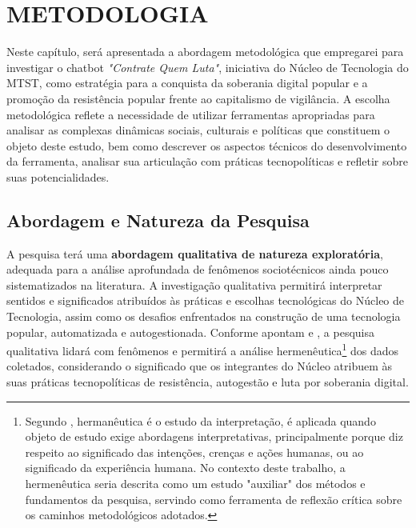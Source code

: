 
\chapter{METODOLOGIA}
\label{chap:metodologia}

Neste capítulo, será apresentada a abordagem metodológica que empregarei para investigar o chatbot \textit{"Contrate Quem Luta"}, iniciativa do Núcleo de Tecnologia do MTST, como estratégia para a conquista da soberania digital popular e a promoção da resistência popular frente ao capitalismo de vigilância. A escolha metodológica reflete a necessidade de utilizar ferramentas apropriadas para analisar as complexas dinâmicas sociais, culturais e políticas que constituem o objeto deste estudo, bem como descrever os aspectos técnicos do desenvolvimento da ferramenta, analisar sua articulação com práticas tecnopolíticas e refletir sobre suas potencialidades.


\section{Abordagem e Natureza da Pesquisa}
A pesquisa terá uma \textbf{abordagem qualitativa de natureza exploratória}, adequada para a análise aprofundada de fenômenos sociotécnicos ainda pouco sistematizados na literatura. A investigação qualitativa permitirá interpretar sentidos e significados atribuídos às práticas e escolhas tecnológicas do Núcleo de Tecnologia, assim como os desafios enfrentados na construção de uma tecnologia popular, automatizada e autogestionada.
Conforme apontam  e , a pesquisa qualitativa lidará com fenômenos e permitirá a análise hermenêutica\footnote{Segundo , hermanêutica é o estudo da interpretação, é aplicada quando objeto de estudo exige abordagens interpretativas, principalmente porque diz respeito ao significado das intenções, crenças e ações humanas, ou ao significado da experiência humana. No contexto deste trabalho, a hermenêutica seria descrita como um estudo "auxiliar" dos métodos e fundamentos da pesquisa, servindo como ferramenta de reflexão crítica sobre os caminhos metodológicos adotados.} dos dados coletados, considerando o significado que os integrantes do Núcleo atribuem às suas práticas tecnopolíticas de resistência, autogestão e luta por soberania digital.


